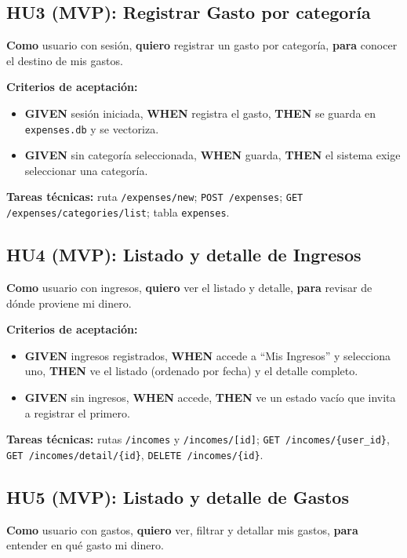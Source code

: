 \documentclass[12pt,letterpaper]{article}
\begin{document}
\subsection{HU3 (MVP): Registrar Gasto por categor\'ia}
\textbf{Como} usuario con sesi\'on, \textbf{quiero} registrar un gasto por categor\'ia,
\textbf{para} conocer el destino de mis gastos.

\textbf{Criterios de aceptaci\'on:}
\begin{itemize}[leftmargin=1.2cm]
  \item \textbf{GIVEN} sesi\'on iniciada, \textbf{WHEN} registra el gasto,
        \textbf{THEN} se guarda en \texttt{expenses.db} y se vectoriza.
  \item \textbf{GIVEN} sin categor\'ia seleccionada, \textbf{WHEN} guarda,
        \textbf{THEN} el sistema exige seleccionar una categor\'ia.
\end{itemize}
\textbf{Tareas t\'ecnicas:} ruta \texttt{/expenses/new}; \texttt{POST /expenses};
\texttt{GET /expenses/categories/list}; tabla \texttt{expenses}.

\subsection{HU4 (MVP): Listado y detalle de Ingresos}
\textbf{Como} usuario con ingresos, \textbf{quiero} ver el listado y detalle,
\textbf{para} revisar de d\'onde proviene mi dinero.

\textbf{Criterios de aceptaci\'on:}
\begin{itemize}[leftmargin=1.2cm]
  \item \textbf{GIVEN} ingresos registrados, \textbf{WHEN} accede a ``Mis Ingresos''
        y selecciona uno, \textbf{THEN} ve el listado (ordenado por fecha) y el
        detalle completo.
  \item \textbf{GIVEN} sin ingresos, \textbf{WHEN} accede, \textbf{THEN} ve un estado
        vac\'io que invita a registrar el primero.
\end{itemize}
\textbf{Tareas t\'ecnicas:} rutas \texttt{/incomes} y \texttt{/incomes/[id]};
\texttt{GET /incomes/\{user\_id\}}, \texttt{GET /incomes/detail/\{id\}},
\texttt{DELETE /incomes/\{id\}}.

\subsection{HU5 (MVP): Listado y detalle de Gastos}
\textbf{Como} usuario con gastos, \textbf{quiero} ver, filtrar y detallar mis gastos,
\textbf{para} entender en qu\'e gasto mi dinero.
\end{document}
